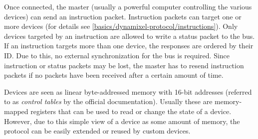 Once connected, the master (usually a powerful computer controlling the various devices) can send an
instruction packet. Instruction packets can target one or more devices (for details see
\ref{basics/dynamixel-protocol/instructions}). Only devices targeted by an instruction are allowed to
write a status packet to the bus. If an instruction targets more than one device, the responses are
ordered by their ID. Due to this, no external synchronization for the bus is required. Since instruction
or status packets may be lost, the master has to resend instruction packets if no packets have been
received after a certain amount of time.

Devices are seen as linear byte-addressed memory with 16-bit addresses (referred to as \textit{control tables}
by the official documentation). Usually these are memory-mapped registers that can be used to read or change
the state of a device. However, due to this simple view of a device as some amount of memory, the protocol can
be easily extended or reused by custom devices.

